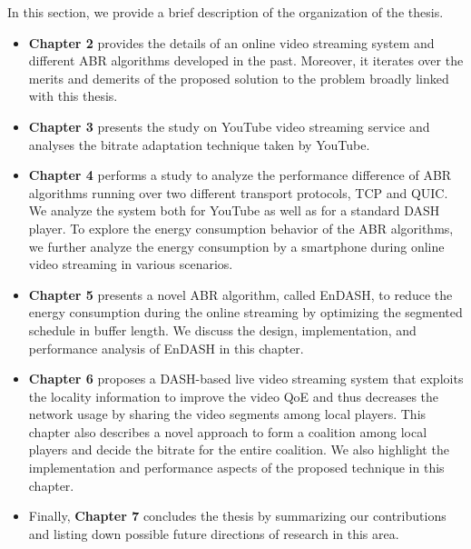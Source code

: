 In this section, we provide a brief description of the organization of the thesis.
\begin{itemize}
	\item {\bf Chapter 2} provides the details of an online video streaming system and different ABR algorithms developed in the past. Moreover, it iterates over the merits and demerits of the proposed solution to the problem broadly linked with this thesis. 
	\item {\bf Chapter 3} presents the study on YouTube video streaming service and analyses the bitrate adaptation technique taken by YouTube.
	\item {\bf Chapter 4} performs a study to analyze the performance difference of ABR algorithms running over two different transport protocols, TCP and QUIC. We analyze the system both for YouTube as well as for a standard DASH player. To explore the energy consumption behavior of the ABR algorithms, we further analyze the energy consumption by a smartphone during online video streaming in various scenarios.
	\item {\bf Chapter 5} presents a novel ABR algorithm, called EnDASH, to reduce the energy consumption during the online streaming by optimizing the segmented schedule in buffer length. We discuss the design, implementation, and performance analysis of EnDASH in this chapter. 
	\item {\bf Chapter 6} proposes a DASH-based live video streaming system that exploits the locality information to improve the video QoE and thus decreases the network usage by sharing the video segments among local players. This chapter also describes a novel approach to form a coalition among local players and decide the bitrate for the entire coalition. We also highlight the implementation and performance aspects of the proposed technique in this chapter. 
	\item Finally, {\bf Chapter 7} concludes the thesis by summarizing our contributions and listing down possible future directions of research in this area.
\end{itemize}
